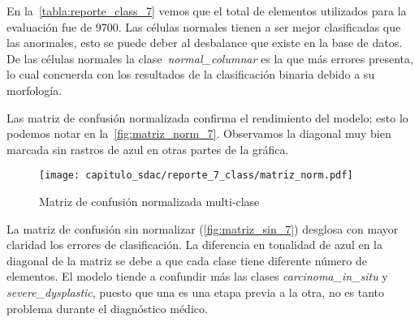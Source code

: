 En la~\autoref{tabla:reporte_class_7} vemos que el total de elementos utilizados
para la evaluación fue de 9700. Las células normales tienen a ser mejor clasificadas que
las anormales, esto se puede deber al desbalance que existe en la base de datos. De las
células normales la clase~\emph{normal\_columnar} es la que más errores presenta, lo cual
concuerda con los resultados de la clasificación binaria debido a su morfología.

\begin{table}[H]
    \centering
    \caption{Reporte de clasificación multi-clase}\label{tabla:reporte_class_7}
    \end{table}

Las matriz de confusión normalizada confirma el rendimiento del modelo; esto lo
podemos notar en la~\autoref{fig:matriz_norm_7}. Observamos la diagonal muy bien
marcada sin rastros de azul en otras partes de la gráfica.

\begin{figure}[]
    \centering
    \texttt{[image: capitulo\_sdac/reporte\_7\_class/matriz\_norm.pdf]}
    \caption{Matriz de confusión normalizada multi-clase}\label{fig:matriz_norm_7}
\end{figure}

La matriz de confusión sin normalizar (\autoref{fig:matriz_sin_7}) desglosa con
mayor claridad los errores de clasificación. La diferencia en tonalidad de azul
en la diagonal de la matriz se debe a que cada clase tiene diferente número de
elementos. El modelo tiende a confundir más las clases
\emph{carcinoma\_in\_situ} y \emph{severe\_dysplastic}, puesto que una es una
etapa previa a la otra, no es tanto problema durante el diagnóstico médico.

